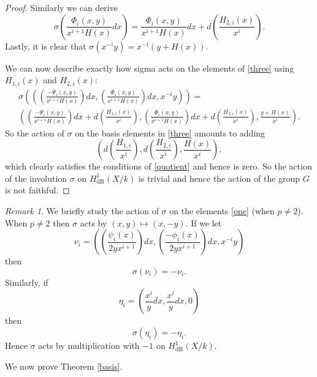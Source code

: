 \documentclass[draft, 11pt]{article} %
\theoremstyle{plain}
\theoremstyle{remark}
\newtheorem*{rem}{Remark}
\newcommand{\derhamhone}{H_{\text {dR}}^1(X/k)}
\begin{document}
\begin{proof}
Similarly we can derive
\begin{equation*}
\sigma \left( \frac{\Phi_i(x,y)}{x^{i+1}H(x)} dx \right)  = \frac{\Phi_i(x,y)}{x^{i+1}H(x)} dx + d \left( \frac{H_{2,i}(x)}{x^i} \right).
\end{equation*}
Lastly, it is clear that $\sigma(x^{-i}y) = x^{-i}(y+H(x))$.


We can now describe exactly how sigma acts on the elements of \eqref{three} using $H_{1,i}(x)$ and $H_{2,i}(x)$:
\begin{multline*}
\sigma \left( \left( \left(\frac{-\Psi_i(x,y)}{x^{i+1}H(x)}\right) dx, \left( \frac{\Phi_i(x,y)}{x^{i+1}H(x)} \right) dx, x^{-i}y \right)\right) = \\
 \left( \left(\frac{-\Psi_i(x,y)}{x^{i+1}H(x)} \right) dx + d\left(\frac{H_{1,i}(x)}{x^i}\right),  \left( \frac{\Phi_i(x,y)}{x^{i+1}H(x)} \right) dx+ d\left(\frac{H_{2,i}(x)}{x^i} \right), \frac{y+H(x)}{x^i} \right).
\end{multline*}
So the action of $\sigma$ on the basis elements in \eqref{three} amounts to adding 
\[
\left( d\left(\frac{H_{1,i}}{x^i}\right), d\left(\frac{H_{2,i}}{x^i}\right), \frac{H(x)}{x^i} \right),
\]
which clearly satisfies the conditions of \eqref{quotient} and hence is zero.
So the action of the involution $\sigma$ on $\derhamhone$ is trivial and hence the action of the group $G$ is not faithful.
\end{proof}

\begin{rem}
We briefly study the action of $\sigma$ on the elements \eqref{one} (when $p\neq 2$).
When $p \neq 2$ then $\sigma$ acts by $(x,y) \mapsto (x,-y)$.
If we let
\[
\nu_i = \left( \left( \frac{\psi_i(x)}{2yx^{i+1}}\right) dx, \left(\frac{-\phi_i(x)}{2yx^{i+1}}\right) dx, x^{-i}y\right)
\]
then 
\begin{equation*}
\sigma(\nu_i) = -\nu_i.
\end{equation*}
Similarly, if 
\[
\eta_i = \left( \frac{x^i}{y}dx, \frac{x^i}{y}dx, 0 \right)
\]
then 
\[
\sigma(\eta_i) = - \eta_i.
\]
Hence $\sigma$ acts by multiplication with $-1$ on $\derhamhone$.
\end{rem}


We now prove Theorem \ref{basis}.
\end{document}
